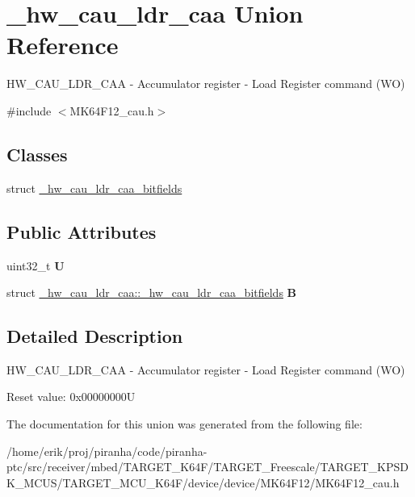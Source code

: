 \hypertarget{union__hw__cau__ldr__caa}{}\section{\+\_\+hw\+\_\+cau\+\_\+ldr\+\_\+caa Union Reference}
\label{union__hw__cau__ldr__caa}


H\+W\+\_\+\+C\+A\+U\+\_\+\+L\+D\+R\+\_\+\+C\+AA -\/ Accumulator register -\/ Load Register command (WO)  




{\ttfamily \#include $<$M\+K64\+F12\+\_\+cau.\+h$>$}

\subsection*{Classes}
\begin{DoxyCompactItemize}
\item 
struct \hyperlink{struct__hw__cau__ldr__caa_1_1__hw__cau__ldr__caa__bitfields}{\+\_\+hw\+\_\+cau\+\_\+ldr\+\_\+caa\+\_\+bitfields}
\end{DoxyCompactItemize}
\subsection*{Public Attributes}
\begin{DoxyCompactItemize}
\item 
uint32\+\_\+t {\bfseries U}\hypertarget{union__hw__cau__ldr__caa_ab277f612faad405ef3be90a1de70dd87}{}\label{union__hw__cau__ldr__caa_ab277f612faad405ef3be90a1de70dd87}

\item 
struct \hyperlink{struct__hw__cau__ldr__caa_1_1__hw__cau__ldr__caa__bitfields}{\+\_\+hw\+\_\+cau\+\_\+ldr\+\_\+caa\+::\+\_\+hw\+\_\+cau\+\_\+ldr\+\_\+caa\+\_\+bitfields} {\bfseries B}\hypertarget{union__hw__cau__ldr__caa_adba307826464ec0d44357993bbb8d35d}{}\label{union__hw__cau__ldr__caa_adba307826464ec0d44357993bbb8d35d}

\end{DoxyCompactItemize}


\subsection{Detailed Description}
H\+W\+\_\+\+C\+A\+U\+\_\+\+L\+D\+R\+\_\+\+C\+AA -\/ Accumulator register -\/ Load Register command (WO) 

Reset value\+: 0x00000000U 

The documentation for this union was generated from the following file\+:\begin{DoxyCompactItemize}
\item 
/home/erik/proj/piranha/code/piranha-\/ptc/src/receiver/mbed/\+T\+A\+R\+G\+E\+T\+\_\+\+K64\+F/\+T\+A\+R\+G\+E\+T\+\_\+\+Freescale/\+T\+A\+R\+G\+E\+T\+\_\+\+K\+P\+S\+D\+K\+\_\+\+M\+C\+U\+S/\+T\+A\+R\+G\+E\+T\+\_\+\+M\+C\+U\+\_\+\+K64\+F/device/device/\+M\+K64\+F12/M\+K64\+F12\+\_\+cau.\+h\end{DoxyCompactItemize}

